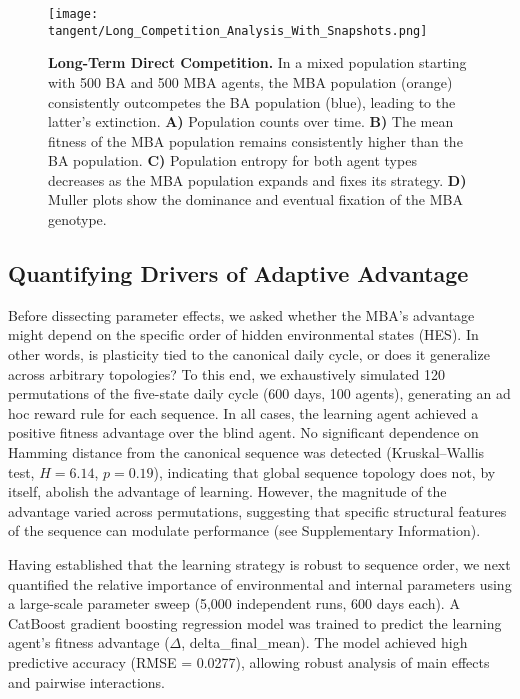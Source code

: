\documentclass[aps,pre,twocolumn,floatfix,nofootinbib,amsmath,amssymb]{revtex4-2}
\begin{document}
\begin{figure*}[t]
    \centering
    \texttt{[image: tangent/Long\_Competition\_Analysis\_With\_Snapshots.png]}
    \caption{\textbf{Long-Term Direct Competition.} In a mixed population starting with 500 BA and 500 MBA agents, the MBA population (orange) consistently outcompetes the BA population (blue), leading to the latter's extinction. \textbf{A)} Population counts over time. \textbf{B)} The mean fitness of the MBA population remains consistently higher than the BA population. \textbf{C)} Population entropy for both agent types decreases as the MBA population expands and fixes its strategy. \textbf{D)} Muller plots show the dominance and eventual fixation of the MBA genotype.}
    \label{fig:competition}
\end{figure*}

\subsection{Quantifying Drivers of Adaptive Advantage}

Before dissecting parameter effects, we asked whether the MBA's advantage might depend on the specific order of hidden environmental states (HES). In other words, is plasticity tied to the canonical daily cycle, or does it generalize across arbitrary topologies? To this end, we exhaustively simulated 120 permutations of the five-state daily cycle (600 days, 100 agents), generating an ad hoc reward rule for each sequence. In all cases, the learning agent achieved a positive fitness advantage over the blind agent. No significant dependence on Hamming distance from the canonical sequence was detected (Kruskal–Wallis test, \(H=6.14\), \(p=0.19\)), indicating that global sequence topology does not, by itself, abolish the advantage of learning. However, the magnitude of the advantage varied across permutations, suggesting that specific structural features of the sequence can modulate performance (see Supplementary Information).  

Having established that the learning strategy is robust to sequence order, we next quantified the relative importance of environmental and internal parameters using a large-scale parameter sweep (5,000 independent runs, 600 days each). A CatBoost gradient boosting regression model was trained to predict the learning agent's fitness advantage (\(\Delta\), delta\_final\_mean). The model achieved high predictive accuracy (RMSE = 0.0277), allowing robust analysis of main effects and pairwise interactions.  
\end{document}
